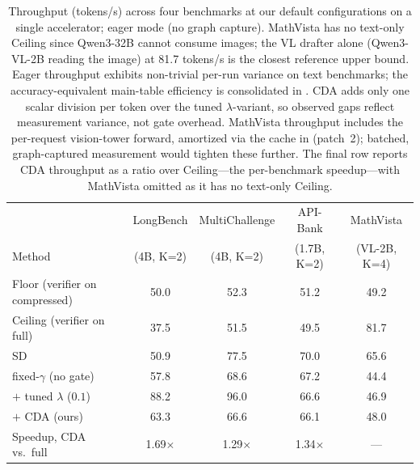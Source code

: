 \documentclass[11pt]{article}
\theoremstyle{plain}
\theoremstyle{definition}
\begin{document}
\begin{table}[h]
\centering
\footnotesize
\setlength{\tabcolsep}{5pt}
\begin{tabular}{l cccc}
\toprule
& LongBench & MultiChallenge & API-Bank & MathVista \\
Method & (4B, K=2) & (4B, K=2) & (1.7B, K=2) & (VL-2B, K=4) \\
\midrule
Floor (verifier on compressed) & 50.0 & 52.3 & 51.2 & 49.2 \\
Ceiling (verifier on full) & 37.5 & 51.5 & 49.5 & 81.7 \\
SD & 50.9 & 77.5 & 70.0 & 65.6 \\
fixed-$\gamma$ (no gate) & 57.8 & 68.6 & 67.2 & 44.4 \\
$+$ tuned $\lambda$ ($0.1$) & 88.2 & 96.0 & 66.6 & 46.9 \\
$+$ CDA (ours) & 63.3 & 66.6 & 66.1 & 48.0 \\
\midrule
Speedup, CDA vs.\ full & 1.69$\times$ & 1.29$\times$ & 1.34$\times$ & --- \\
\bottomrule
\end{tabular}
\caption{Throughput (tokens/s) across four benchmarks at our default configurations on a single accelerator; eager mode (no graph capture). MathVista has no text-only Ceiling since Qwen3-32B cannot consume images; the VL drafter alone (Qwen3-VL-2B reading the image) at 81.7 tokens/s is the closest reference upper bound. Eager throughput exhibits non-trivial per-run variance on text benchmarks; the accuracy-equivalent main-table efficiency is consolidated in . CDA adds only one scalar division per token over the tuned $\lambda$-variant, so observed gaps reflect measurement variance, not gate overhead. MathVista throughput includes the per-request vision-tower forward, amortized via the cache in  (patch~2); batched, graph-captured measurement would tighten these further. The final row reports CDA throughput as a ratio over Ceiling---the per-benchmark speedup---with MathVista omitted as it has no text-only Ceiling.}
\label{tab:speed_4dataset}
\end{table}
\end{document}
